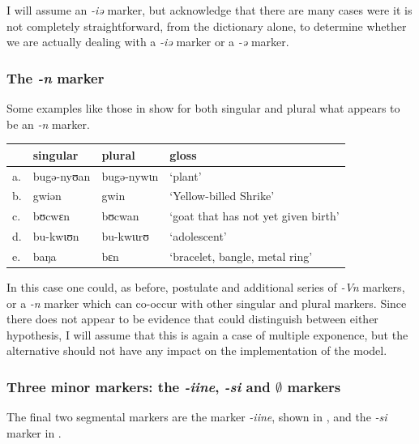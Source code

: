I will assume an \textit{-iə} marker, but acknowledge that there are many cases were it is not completely straightforward, from the dictionary alone, to determine whether we are actually dealing with a \textit{-iə} marker or a \textit{-ə} marker.

\subsubsection{The \textit{-n} marker}

Some examples like those in  show for both singular and plural what appears to be an \textit{-n} marker.

\begin{exe}
    \ex \label{n-kazem}
    \begin{tabular}[t]{llll}
      & singular   & plural     & gloss                               \\
      \midrule
      a. & bugə-nyʊan & bugə-nywɩn & `plant'                             \\
      b. & gwiən      & gwin       & `Yellow-billed Shrike'              \\
      c. & bʊcwɛn     & bʊcwan     & `goat that has not yet given birth' \\
      d. & bu-kwɩʊn   & bu-kwɩɩrʊ  & `adolescent'                        \\
      e. & baŋa       & bɛn        & `bracelet, bangle, metal ring'      \\
    \end{tabular}
\end{exe}

In this case one could, as before, postulate and additional series of \textit{-Vn} markers, or a \textit{-n} marker which can co-occur with other singular and plural markers. Since there does not appear to be evidence that could distinguish between either hypothesis, I will assume that this is again a case of multiple exponence, but the alternative should not have any impact on the implementation of the model.

\subsubsection{Three minor markers: the \textit{-iine}, \textit{-si} and $\emptyset$ markers}

The final two segmental markers are the marker \textit{-iine}, shown in , and the \textit{-si} marker in .

